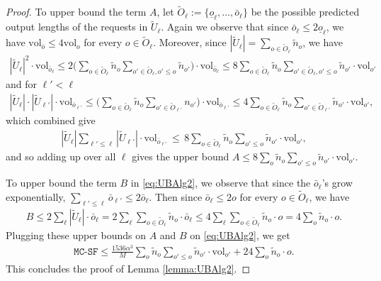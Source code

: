 \documentclass[11pt, a4paper]{article}
\theoremstyle{plain}
\theoremstyle{definition}
\theoremstyle{remark}
\newcommand{\mcsdf}{\texttt{MC-SF}}
\newcommand{\vol}{\textrm{vol}}
\newcommand{\alg}{\mcsdf}
\begin{document}
\begin{proof}
	To upper bound the term $A$, let $\tilde{O}_\ell := \{\underline{o}_\ell, \ldots, \bar{o}_\ell\}$ be the possible predicted output lengths of the requests in $\tilde{U}_\ell$. Again we observe that since $\bar{o}_{\ell} \le 2\underline{o}_\ell$, we have $\vol_{\bar{o}} \le 4 \vol_o$ for every $o \in \tilde{O}_\ell$. Moreover, since $|\tilde{U}_\ell| = \sum_{o \in \tilde{O}_\ell} \tilde{n}_o$, we have 
	\begin{gather*}
	|\tilde{U}_\ell|^2 \cdot \vol_{\bar{o}_\ell} \le 2 \bigg(\sum_{o \in \tilde{O}_\ell} \tilde{n}_o \sum_{o' \in \tilde{O}_\ell, o' \le o} \tilde{n}_{o'}\bigg) \cdot  \vol_{\bar{o}_\ell} \le  8 \sum_{o \in \tilde{O}_\ell} \tilde{n}_o \sum_{o' \in \tilde{O}_\ell, o' \le o} \tilde{n}_{o'} \cdot  \vol_{o'}
	\end{gather*}
	and for $\ell' < \ell$ 
	\begin{gather*}
	|\tilde{U}_\ell| \cdot |\tilde{U}_{\ell'}| \cdot \vol_{\bar{o}_{\ell'}} \le \bigg(\sum_{o \in \tilde{O}_\ell} \tilde{n}_o \sum_{o' \in \tilde{O}_{\ell'}} n_{o'}\bigg) \cdot  \vol_{\bar{o}_{\ell'}} \le  4 \sum_{o \in \tilde{O}_\ell} \tilde{n}_o \sum_{o' \in \tilde{O}_{\ell'}} \tilde{n}_{o'} \cdot  \vol_{o'},
	\end{gather*}	
	which combined give
	\begin{gather*}
	|\tilde{U}_\ell| \sum_{\ell' \le \ell} |\tilde{U}_{\ell'}| \cdot \vol_{\bar{o}_{\ell'}} \,\le\, 8  \sum_{o \in \tilde{O}_\ell} \tilde{n}_o \sum_{o' \le o} \tilde{n}_{o'} \cdot  \vol_{o'},
	\end{gather*}	
	and so adding up over all $\ell$ gives the upper bound $A \le 8 \sum_o \tilde{n}_o \sum_{o' \le o} \tilde{n}_{o'} \cdot  \vol_{o'}.$
	
	To upper bound the term $B$ in \eqref{eq:UBAlg2}, we observe that since the $\bar{o}_\ell$'s grow exponentially, $\sum_{\ell' \le \ell} \bar{o}_{\ell'} \le 2 \bar{o}_{\ell}.$ Then since $\bar{o}_{\ell} \le 2 o$ for every $o \in \tilde{O}_{\ell}$, we have
	\begin{align*}
		B \le 2 \sum_\ell |\tilde{U}_\ell| \cdot \bar{o}_{\ell} = 2 \sum_\ell \sum_{o \in \tilde{O}_\ell} \tilde{n}_o \cdot \bar{o}_{\ell} \le  4 \sum_\ell \sum_{o \in \tilde{O}_\ell} \tilde{n}_o \cdot o = 4 \sum_o \tilde{n}_o \cdot o.
	\end{align*}
	Plugging these upper bounds on $A$ and $B$ on \eqref{eq:UBAlg2}, we get
	\begin{align*}
		\alg \le \frac{1536\alpha^3}{M} \sum_o \tilde{n}_o \sum_{o' \le o} \tilde{n}_{o'} \cdot  \vol_{o'} + 24 \sum_o \tilde{n}_o \cdot o.
	\end{align*}
	This concludes the proof of Lemma \ref{lemma:UBAlg2}.
\end{proof}
\end{document}
